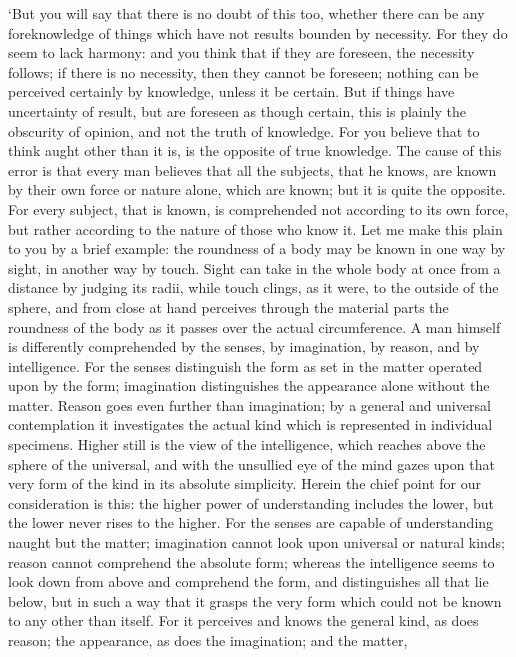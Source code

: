 `But you will say that there is no doubt of this too, whether there
can be any foreknowledge of things which have not results bounden by
necessity. For they do seem to lack harmony: and you think that if
they are foreseen, the necessity follows; if there is no necessity,
then they cannot be foreseen; nothing can be perceived certainly by
knowledge, unless it be certain. But if things have uncertainty of
result, but are foreseen as though certain, this is plainly the
obscurity of opinion, and not the truth of knowledge. For you believe
that to think aught other than it is, is the opposite of true
knowledge. The cause of this error is that every man believes that all
the subjects, that he knows, are known by their own force or
 nature alone, which are known; but it is quite the
opposite. For every subject, that is known, is comprehended not
according to its own force, but rather according to the nature of
those who know it. Let me make this plain to you by a brief example:
the roundness of a body may be known in one way by sight, in another
way by touch. Sight can take in the whole body at once from a distance
by judging its radii, while touch clings, as it were, to the outside
of the sphere, and from close at hand perceives through the material
parts the roundness of the body as it passes over the actual
circumference. A man himself is differently comprehended by the
senses, by imagination, by reason, and by intelligence. For the senses
distinguish the form as set in the matter operated upon by the form;
imagination distinguishes the appearance alone without the matter.
Reason goes even further than imagination; by a general and universal
contemplation it investigates the actual kind which is represented in
individual specimens. Higher still is the view of the intelligence,
which reaches above the sphere of the universal, and with the
unsullied eye of the mind gazes upon that very form of the kind in its
absolute simplicity. Herein the chief point for our consideration is
this: the higher power of understanding includes the lower, but the
lower never rises to the higher. For the senses are capable of
understanding naught but the matter; imagination cannot look upon
universal or natural kinds; reason cannot comprehend  the
absolute form; whereas the intelligence seems to look down from above
and comprehend the form, and distinguishes all that lie below, but in
such a way that it grasps the very form which could not be known to
any other than itself. For it perceives and knows the general kind, as
does reason; the appearance, as does the imagination; and the matter,
